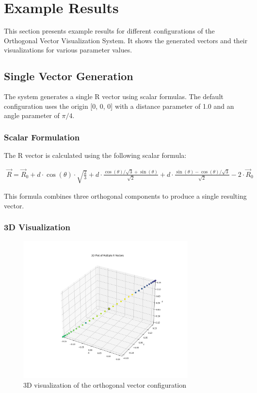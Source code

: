 
\newpage
\section{Example Results}

This section presents example results for different configurations of the Orthogonal Vector Visualization System. It shows the generated vectors and their visualizations for various parameter values.

\subsection{Single Vector Generation}

The system generates a single R vector using scalar formulas. The default configuration uses the origin [0, 0, 0] with a distance parameter of 1.0 and an angle parameter of $\pi/4$.

\subsubsection{Scalar Formulation}

The R vector is calculated using the following scalar formula:

\begin{align}
\vec{R} = \vec{R}_0 + d \cdot \cos(\theta) \cdot \sqrt{\frac{2}{3}} + d \cdot \frac{\cos(\theta)/\sqrt{3} + \sin(\theta)}{\sqrt{2}} + d \cdot \frac{\sin(\theta) - \cos(\theta)/\sqrt{3}}{\sqrt{2}} - 2 \cdot \vec{R}_0
\end{align}

This formula combines three orthogonal components to produce a single resulting vector.

\subsubsection{3D Visualization}

\begin{figure}[H]
    \centering
    \includegraphics[width=0.8\textwidth]{figures/circle_3d.png}
    \caption{3D visualization of the orthogonal vector configuration}
    \label{fig:example_default_3d}
\end{figure}

